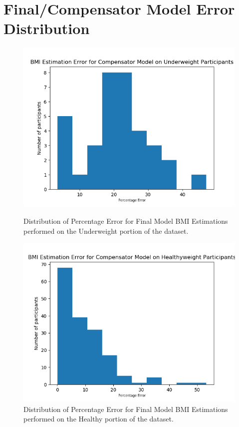 \documentclass[conference]{IEEEtran}
\begin{document}
\section{Final/Compensator Model Error Distribution}

\begin{figure}[H]
    \centering
    \begin{minipage}[b]{0.35\textwidth}
    \includegraphics[width=\linewidth]{compundererror.png}
    \caption{Distribution of Percentage Error for Final Model BMI Estimations performed on the Underweight portion of the dataset.}
    \label{fig:compundererror}
    \end{minipage}
    \hspace{1cm}
    \begin{minipage}[b]{0.35\textwidth}
    \includegraphics[width=\linewidth]{comphealthyerror.png}
    \caption{Distribution of Percentage Error for Final Model BMI Estimations performed on the Healthy portion of the dataset.}
    \label{fig:comphealthyerror}
    \end{minipage}
\end{figure}
\end{document}
